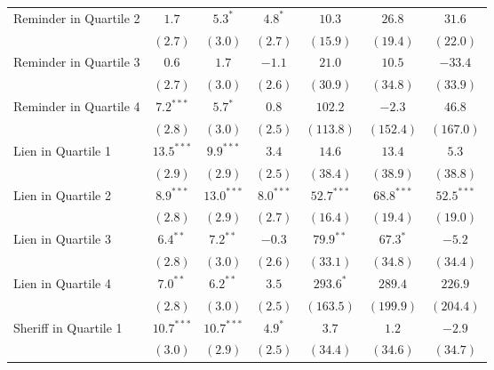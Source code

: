 \documentclass[12pt]{article}
\begin{document}
\begin{center}
\begin{longtable}{l c c c c c c }
Reminder in Quartile 2     & $1.7$         & $5.3^{*}$     & $4.8^{*}$    & $10.3$        & $26.8$         & $31.6$         \\
                           & $(2.7)$       & $(3.0)$       & $(2.7)$      & $(15.9)$      & $(19.4)$       & $(22.0)$       \\
Reminder in Quartile 3     & $0.6$         & $1.7$         & $-1.1$       & $21.0$        & $10.5$         & $-33.4$        \\
                           & $(2.7)$       & $(3.0)$       & $(2.6)$      & $(30.9)$      & $(34.8)$       & $(33.9)$       \\
Reminder in Quartile 4     & $7.2^{***}$   & $5.7^{*}$     & $0.8$        & $102.2$       & $-2.3$         & $46.8$         \\
                           & $(2.8)$       & $(3.0)$       & $(2.5)$      & $(113.8)$     & $(152.4)$      & $(167.0)$      \\
Lien in Quartile 1         & $13.5^{***}$  & $9.9^{***}$   & $3.4$        & $14.6$        & $13.4$         & $5.3$          \\
                           & $(2.9)$       & $(2.9)$       & $(2.5)$      & $(38.4)$      & $(38.9)$       & $(38.8)$       \\
Lien in Quartile 2         & $8.9^{***}$   & $13.0^{***}$  & $8.0^{***}$  & $52.7^{***}$  & $68.8^{***}$   & $52.5^{***}$   \\
                           & $(2.8)$       & $(2.9)$       & $(2.7)$      & $(16.4)$      & $(19.4)$       & $(19.0)$       \\
Lien in Quartile 3         & $6.4^{**}$    & $7.2^{**}$    & $-0.3$       & $79.9^{**}$   & $67.3^{*}$     & $-5.2$         \\
                           & $(2.8)$       & $(3.0)$       & $(2.6)$      & $(33.1)$      & $(34.8)$       & $(34.4)$       \\
Lien in Quartile 4         & $7.0^{**}$    & $6.2^{**}$    & $3.5$        & $293.6^{*}$   & $289.4$        & $226.9$        \\
                           & $(2.8)$       & $(3.0)$       & $(2.5)$      & $(163.5)$     & $(199.9)$      & $(204.4)$      \\
Sheriff in Quartile 1      & $10.7^{***}$  & $10.7^{***}$  & $4.9^{*}$    & $3.7$         & $1.2$          & $-2.9$         \\
                           & $(3.0)$       & $(2.9)$       & $(2.5)$      & $(34.4)$      & $(34.6)$       & $(34.7)$       \\

\end{longtable}
\end{center}
\end{document}
